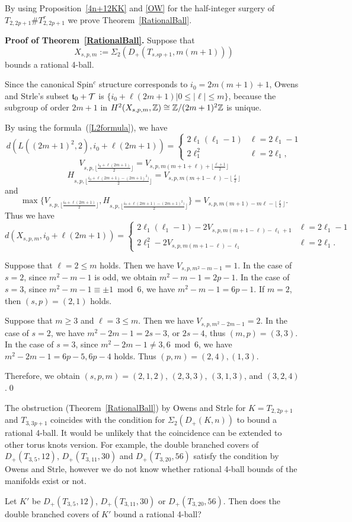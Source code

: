 \documentclass[11pt]{amsart}
\begin{document}
By using Proposition~\ref{4n+12KK} and \ref{OW} for the half-integer surgery of $T_{2,2p+1}\#T_{2,2p+1}^r$ we prove Theorem~\ref{RationalBall}.

{\bf Proof of Theorem~\ref{RationalBall}.}
Suppose that 
$$X_{s,p,m}:=\Sigma_2(D_+(T_{s.sp+1},m(m+1)))$$
bounds a rational 4-ball.

Since the canonical Spin$^c$ structure corresponds to $i_0=2m(m+1)+1$, 
Owens and Strle's subset $\frak{t}_0+{\mathcal T}$ is $\{i_0+\ell(2m+1)|0\le|\ell|\le m\}$,
because the subgroup of order $2m+1$ in $H^2(X_{s,p,m},{\Bbb Z})\cong {\Bbb Z}/(2m+1)^2{\Bbb Z}$
is unique.

By using the formula~(\ref{L2formula}), we have	
$$d(L((2m+1)^2,2),i_0+\ell(2m+1))=\begin{cases}2\ell_1(\ell_1-1)&\ell=2\ell_1-1\\2\ell_1^2&\ell=2\ell_1,\end{cases}$$
$$V_{s,p,\lfloor\frac{i_0+\ell(2m+1)}{2}\rfloor}=V_{s,p,m(m+1+\ell)+\lfloor\frac{\ell+1}2\rfloor}$$
$$H_{s,p,\lfloor\frac{i_0+\ell(2m+1)-(2m+1)^2)}{2}\rfloor}=V_{s,p,m(m+1-\ell)-\lfloor\frac{\ell}{2}\rfloor}$$
and 
$$\max\{V_{s,p,\lfloor\frac{i_0+\ell(2m+1)}{2}\rfloor},H_{s,p,\lfloor\frac{i_0+\ell(2m+1)-(2m+1)^2)}{2}\rfloor}\}=V_{s,p,m(m+1)-m\ell-\lfloor\frac{\ell}{2}\rfloor}.$$
Thus we have
$$d(X_{s,p,m},i_0+\ell(2m+1))=\begin{cases}2\ell_1(\ell_1-1)-2V_{s,p,m(m+1-\ell)-\ell_1+1}&\ell=2\ell_1-1\\2\ell_1^2-2V_{s,p,m(m+1-\ell)-\ell_1}&\ell=2\ell_1.\end{cases}$$

Suppose that $\ell=2\le m$ holds.
Then we have $V_{s,p,m^2-m-1}=1$.
In the case of $s=2$, since $m^2-m-1$ is odd, we obtain $m^2-m-1=2p-1$.
In the case of $s=3$, since $m^2-m-1\equiv \pm1\bmod 6$, we have $m^2-m-1=6p-1$.
If $m=2$, then $(s,p)=(2,1)$ holds. 

Suppose that $m\ge 3$ and $\ell=3\le m$.
Then we have $V_{s,p,m^2-2m-1}=2$.
In the case of $s=2$, we have $m^2-2m-1=2s-3$, or $2s-4$, thus $(m,p)=(3,3)$.
In the case of $s=3$, since $m^2-2m-1\neq 3,6\bmod 6$, we have $m^2-2m-1=6p-5,6p-4$ holds.
Thus $(p,m)=(2,4),(1,3)$.

Therefore, we obtain $(s,p,m)=(2,1,2)$, $(2,3,3)$, $(3,1,3)$, and $(3,2,4)$.\hfill\qed

The obstruction (Theorem~\ref{RationalBall}) by Owens and Strle \cite{Ow} for $K=T_{2,2p+1}$ and $T_{3,3p+1}$ coincides with
the condition for $\Sigma_2(D_+(K,n))$ to bound a rational 4-ball.
It would be unlikely that the coincidence can be extended to other torus knots version.
For example, the double branched covers of $D_+(T_{3,5},12)$, $D_+(T_{3,11},30)$ and $D_+(T_{3,20},56)$ satisfy the condition by Owens and Strle,
however we do not know whether rational 4-ball bounds of the manifolds exist or not.
\begin{que}
Let $K'$ be $D_+(T_{3,5},12)$, $D_+(T_{3,11},30)$ or $D_+(T_{3,20},56)$.
Then does the double branched covers of $K'$ bound a rational 4-ball?
\end{que}
\end{document}
